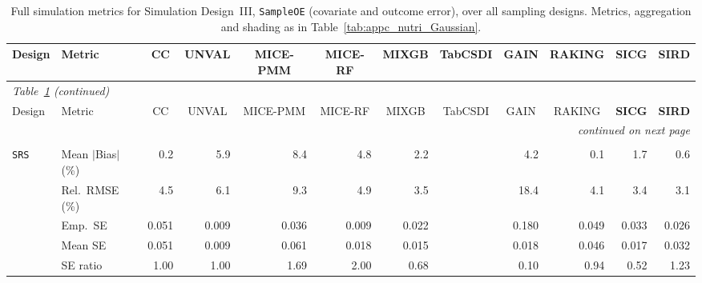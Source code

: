 \begin{landscape}
\footnotesize\setlength{\tabcolsep}{3.5pt}
\begin{longtable}{llrrrrrrrrrr}
\caption{Full simulation metrics for Simulation Design~III, \texttt{SampleOE} (covariate and outcome error), over all sampling designs. Metrics, aggregation and shading as in Table~\ref{tab:appc_nutri_Gaussian}.}
\label{tab:appc_surv_SampleOE} \\
\toprule
Design & Metric & \multicolumn{1}{c}{CC} & \multicolumn{1}{c}{UNVAL} & \multicolumn{1}{c}{MICE-PMM} & \multicolumn{1}{c}{MICE-RF} & \multicolumn{1}{c}{MIXGB} & \multicolumn{1}{c}{TabCSDI} & \multicolumn{1}{c}{GAIN} & \multicolumn{1}{c}{RAKING} & \multicolumn{1}{c}{\textbf{SICG}} & \multicolumn{1}{c}{\textbf{SIRD}} \\
\midrule
\endfirsthead
\multicolumn{12}{l}{\footnotesize\itshape Table~\ref{tab:appc_surv_SampleOE} (continued)} \\
\toprule
Design & Metric & \multicolumn{1}{c}{CC} & \multicolumn{1}{c}{UNVAL} & \multicolumn{1}{c}{MICE-PMM} & \multicolumn{1}{c}{MICE-RF} & \multicolumn{1}{c}{MIXGB} & \multicolumn{1}{c}{TabCSDI} & \multicolumn{1}{c}{GAIN} & \multicolumn{1}{c}{RAKING} & \multicolumn{1}{c}{\textbf{SICG}} & \multicolumn{1}{c}{\textbf{SIRD}} \\
\midrule
\endhead
\midrule \multicolumn{12}{r}{\footnotesize\itshape continued on next page} \\
\endfoot
\bottomrule
\endlastfoot
\multicolumn{12}{l}{\textbf{Continuous Phase-Two Covariates}} \\
\addlinespace[2pt]
\quad \texttt{SRS} & Mean $|$Bias$|$ (\%) & \cellcolor{ranktwo}0.2 & 5.9 & 8.4 & 4.8 & 2.2 &  & 4.2 & \cellcolor{rankone}0.1 & 1.7 & \cellcolor{rankthree}0.6 \\
 & Rel.\ RMSE (\%) & 4.5 & 6.1 & 9.3 & 4.9 & \cellcolor{rankthree}3.5 &  & 18.4 & 4.1 & \cellcolor{ranktwo}3.4 & \cellcolor{rankone}3.1 \\
 & Emp.\ SE & 0.051 & 0.009 & 0.036 & 0.009 & 0.022 &  & 0.180 & 0.049 & 0.033 & 0.026 \\
 & Mean SE & 0.051 & 0.009 & 0.061 & 0.018 & 0.015 &  & 0.018 & 0.046 & 0.017 & 0.032 \\
 & SE ratio & \cellcolor{rankone}1.00 & \cellcolor{rankone}1.00 & 1.69 & 2.00 & 0.68 &  & 0.10 & \cellcolor{ranktwo}0.94 & 0.52 & \cellcolor{rankthree}1.23 \\

\end{longtable}
\end{landscape}
